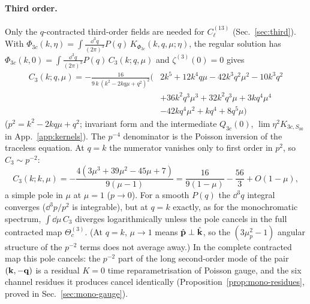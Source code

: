 \paragraph{Third order.}
Only the $q$-contracted third-order fields are needed for $C^{(13)}_\ell$ (Sec.~\ref{sec:third}).  With
$\Phi_{3c}(k,\eta)=\int\!\frac{\dd^3q}{(2\pi)^3}P(q)\,K_{\Phi_{3c}}(k,q,\mu;\eta)$, the regular solution has
$\Phi_{3c}(k,0)=\int\frac{\dd^3q}{(2\pi)^3}P(q)\,C_3(k;q,\mu)$ and $\zeta^{(3)}(0)=0$ gives
\begin{equation}
\boxed{\;\begin{aligned}C_3(k;q,\mu)=-\frac{16}{9\,k\,(k^2-2kq\mu+q^2)^2}\big(&2k^5+12k^4q\mu-42k^3q^2\mu^2-10k^3q^2\\
&+36k^2q^3\mu^3+32k^2q^3\mu+3kq^4\mu^4\\&-42kq^4\mu^2+kq^4+8q^5\mu\big)\end{aligned}\;}
\label{eq:C3}
\end{equation}
($p^2=k^2-2kq\mu+q^2$; invariant form and the intermediate $Q_{3c}(0)$, $\lim\eta^2K_{3c,S_{00}}$ in
App.~\ref{app:kernels}).  The $p^{-4}$ denominator is the Poisson inversion of the traceless equation.  At $q=k$ the numerator
vanishes only to first order in $p^2$, so $C_3\sim p^{-2}$:
\begin{equation}
C_3(k;k,\mu)=-\frac{4(3\mu^3+39\mu^2-45\mu+7)}{9(\mu-1)}=\frac{16}{9(1-\mu)}-\frac{56}3+O(1-\mu),
\label{eq:C3pole}
\end{equation}
a simple pole in $\mu$ at $\mu=1$ ($p\to0$).  For a smooth $P(q)$ the $\dd^3q$ integral converges ($\dd^3p/p^2$ is integrable), but at
$q=k$ exactly, as for the monochromatic spectrum, $\int\dd\mu\,C_3$ diverges logarithmically unless the pole cancels in the full
contracted map $\Theta^{(3)}_c$.  (At $q=k$, $\mu\to1$ means $\hat{\mathbf p}\perp\hat{\mathbf k}$, so the $(3\mu_p^2-1)$ angular structure of the $p^{-2}$
terms does not average away.)
In the complete contracted map this pole cancels: the $p^{-2}$ part of the long second-order mode of the pair $(\mathbf k,-\mathbf q)$ is a residual
$K=0$ time reparametrisation of Poisson gauge, and the six channel residues it produces cancel identically (Proposition~\ref{prop:mono-residues},
proved in Sec.~\ref{sec:mono-gauge}).

